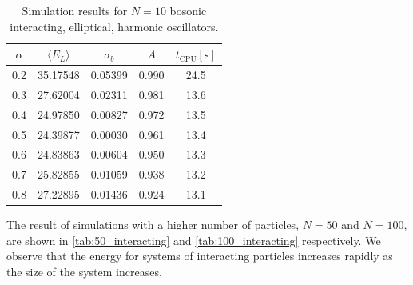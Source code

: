 \documentclass[
    a4paper, aps, twocolumn, floatfix, superscriptaddress, nofootinbib]{revtex4-1}
\newcommand{\1}{\mathds{1}}
\begin{document}
        \begin{table}
            \caption{Simulation results for $N = 10$ bosonic interacting,
            elliptical, harmonic oscillators.}
            \centering
            \begin{ruledtabular}
                \begin{tabular}{ccccc}
                    $\alpha$ & $\langle  E_L\rangle$ & $\sigma_b$
                    &$A$ & $t_{\text{CPU}} [\si{\second}]$ \\
                    \hline
                    0.2&35.17548&0.05399&0.990%
                    &24.5\\%
                    0.3&27.62004&0.02311&0.981%
                    &13.6\\%
                    0.4&24.97850&0.00827&0.972%
                    &13.5\\%
                    0.5&24.39877&0.00030&0.961%
                    &13.4\\%
                    0.6&24.83863&0.00604&0.950%
                    &13.3\\%
                    0.7&25.82855&0.01059&0.938%
                    &13.2\\%
                    0.8&27.22895&0.01436&0.924%
                    &13.1\\%
                \end{tabular}
            \end{ruledtabular}
            \label{tab:10_interacting}
        \end{table}

        The result of simulations with a higher number of particles, $N=50$ and
        $N=100$, are  shown in \autoref{tab:50_interacting} and
        \autoref{tab:100_interacting} respectively. We observe that the energy
        for systems of interacting particles increases rapidly as the size of
        the system increases.
\end{document}
